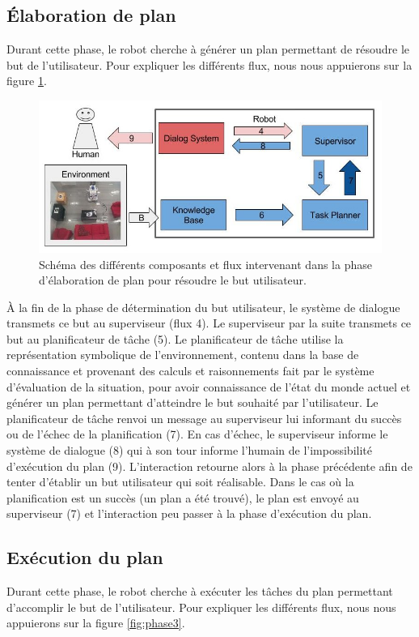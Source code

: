\documentclass[a4paper,11pt,twoside]{StyleThese}
\begin{document}
\subsection{Élaboration de plan}
\label{sec:phase2}
Durant cette phase, le robot cherche à générer un plan permettant de résoudre le but de l'utilisateur. Pour expliquer les différents flux, nous nous appuierons sur la figure \ref{fig:phase2}.

\begin{figure}[ht!]
 \centering
  \includegraphics[width=0.99\linewidth]{./img/phase2color.jpg} 
  \caption {Schéma des différents composants et flux intervenant dans la phase d'élaboration de plan pour résoudre le but utilisateur.}
  \label{fig:phase2}
\end{figure}

À la fin de la phase de détermination du but utilisateur, le système de dialogue transmets ce but au superviseur (flux 4). Le superviseur par la suite transmets ce but au planificateur de tâche (5). Le planificateur de tâche utilise la représentation symbolique de l'environnement, contenu dans la base de connaissance et provenant des calculs et raisonnements fait par le système d'évaluation de la situation, pour avoir connaissance de l'état du monde actuel et générer un plan permettant d'atteindre le but souhaité par l'utilisateur. Le planificateur de tâche renvoi un message au superviseur lui informant du succès ou de l'échec de la planification (7). En cas d'échec, le superviseur informe le système de dialogue (8) qui à son tour informe l'humain de l'impossibilité d'exécution du plan (9).
L'interaction retourne alors à la phase précédente afin de tenter d'établir un but utilisateur qui soit réalisable. 
Dans le cas où la planification est un succès (un plan a été trouvé), le plan est envoyé au superviseur (7) et l'interaction peu passer à la phase d'exécution du plan.


\subsection{Exécution du plan}
\label{sec:phase3}
Durant cette phase, le robot cherche à exécuter les tâches du plan permettant d'accomplir le but de l'utilisateur. Pour expliquer les différents flux, nous nous appuierons sur la figure \ref{fig:phase3}.
\end{document}
